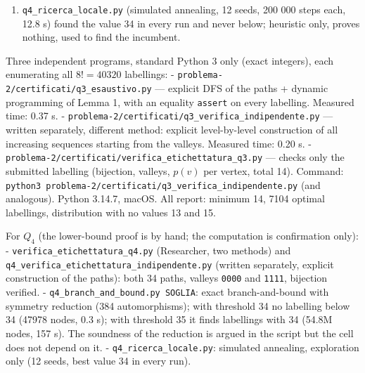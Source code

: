 \begin{enumerate}
  minimising \(\sum_{v\in U}\max(1,a(v)+d(v))\) over nonnegative \(d\)
  with \(\sum d=E(U)\) gives
  \(\sum_{v\in U,a(v)\ge1}a(v)+\max(\#\{v\in U:a(v)=0\},E(U))\), so
  \(\text{LB}=\sum_{v\in S}p(v)+\sum_{v\in U,a(v)\ge1}a(v)+\max(\#\{a=0\},E(U))\)
  is a valid lower bound for every completion; a node is pruned iff
  \(\text{LB}\ge T\). Results: \(T=34\): \textbf{0 labellings found}, 47
  978 nodes, 0.3 s. \(T=35\): 19 525 440 labellings with exactly 34
  reached by the reduced search, 54 814 700 nodes, 156.8 s (shows the
  pruning is not over-aggressive at the optimum). Sanity check on
  \(Q_3\) (same code with \texttt{D\ =\ 3}): \(T=13\): 0 found;
  \(T=14\): 0 found (83 nodes); \(T=15\): 148 found, and
  \(148\cdot48=7104\) is exactly the known number of optimal labellings
  of \(Q_3\) (\(|\mathrm{Aut}(Q_3)|=48\)). This search is a confirmation
  only; the proof of \(U(Q_4)\ge34\) is the hand argument above.
\item
  \texttt{q4\_ricerca\_locale.py} (simulated annealing, 12 seeds, 200
  000 steps each, 12.8 s) found the value 34 in every run and never
  below; heuristic only, proves nothing, used to find the incumbent.
\end{enumerate}


Three independent programs, standard Python 3 only (exact integers),
each enumerating all \(8!=40320\) labellings: -
\texttt{problema-2/certificati/q3\_esaustivo.py} --- explicit DFS of the
paths + dynamic programming of Lemma 1, with an equality \texttt{assert}
on every labelling. Measured time: 0.37 s. -
\texttt{problema-2/certificati/q3\_verifica\_indipendente.py} ---
written separately, different method: explicit level-by-level
construction of all increasing sequences starting from the valleys.
Measured time: 0.20 s. -
\texttt{problema-2/certificati/verifica\_etichettatura\_q3.py} ---
checks only the submitted labelling (bijection, valleys, \(p(v)\) per
vertex, total 14). Command:
\texttt{python3\ problema-2/certificati/q3\_verifica\_indipendente.py}
(and analogous). Python 3.14.7, macOS. All report: minimum 14, 7104
optimal labellings, distribution with no values 13 and 15.

For \(Q_4\) (the lower-bound proof is by hand; the computation is
confirmation only): - \texttt{verifica\_etichettatura\_q4.py}
(Researcher, two methods) and
\texttt{q4\_verifica\_etichettatura\_indipendente.py} (written
separately, explicit construction of the paths): both 34 paths, valleys
\texttt{0000} and \texttt{1111}, bijection verified. -
\texttt{q4\_branch\_and\_bound.py\ SOGLIA}: exact branch-and-bound with
symmetry reduction (384 automorphisms); with threshold 34 no labelling
below 34 (47978 nodes, 0.3 s); with threshold 35 it finds labellings
with 34 (54.8M nodes, 157 s). The soundness of the reduction is argued
in the script but the cell does not depend on it. -
\texttt{q4\_ricerca\_locale.py}: simulated annealing, exploration only
(12 seeds, best value 34 in every run).



